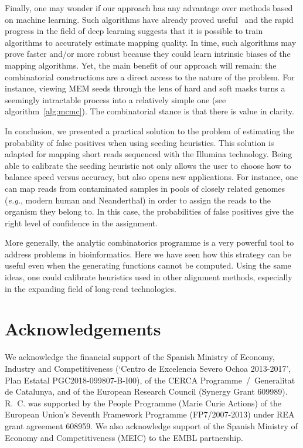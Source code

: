 \documentclass{article}
\begin{document}
Finally, one may wonder if our approach has any advantage over methods
based on machine learning. Such algorithms have already proved
useful~\cite{lee2014mosaik} and the rapid progress in the field of deep
learning suggests that it is possible to train algorithms to accurately
estimate mapping quality. In time, such algorithms may prove faster and/or
more robust because they could learn intrinsic biases of the mapping
algorithms. Yet, the main benefit of our approach will remain: the
combinatorial constructions are a direct access to the nature of the
problem. For instance, viewing MEM seeds through the lens of hard and soft
masks turns a seemingly intractable process into a relatively simple one
(see algorithm~\ref{alg:mcmc}). The combinatorial stance is that there is
value in clarity.

In conclusion, we presented a practical solution to the problem of
estimating the probability of false positives when using seeding
heuristics. This solution is adapted for mapping short reads sequenced
with the Illumina technology. Being able to calibrate the seeding
heuristic not only allows the user to choose how to balance speed versus
accuracy, but also opens new applications. For instance, one can map reads
from contaminated samples in pools of closely related genomes
(\textit{e.g.}, modern human and Neanderthal) in order to assign the reads
to the organism they belong to. In this case, the probabilities of false
positives give the right level of confidence in the assignment.

More generally, the analytic combinatorics programme is a very powerful
tool to address problems in bioinformatics. Here we have seen how this
strategy can be useful even when the generating functions cannot be
computed. Using the same ideas, one could calibrate heuristics used in
other alignment methods, especially in the expanding field of long-read
technologies.


\section*{Acknowledgements}

We acknowledge the financial support of the Spanish Ministry of Economy,
Industry and Competitiveness (`Centro de Excelencia Severo Ochoa
2013-2017', Plan Estatal PGC2018-099807-B-I00), of the CERCA
Programme~/~Generalitat de Catalunya, and of the European Research Council
(Synergy Grant 609989). R.~C. was supported by the People Programme
(Marie Curie Actions) of the European Union's Seventh Framework Programme
(FP7/2007-2013) under REA grant agreement 608959. We also acknowledge
support of the Spanish Ministry of Economy and Competitiveness (MEIC) to
the EMBL partnership.
\end{document}
